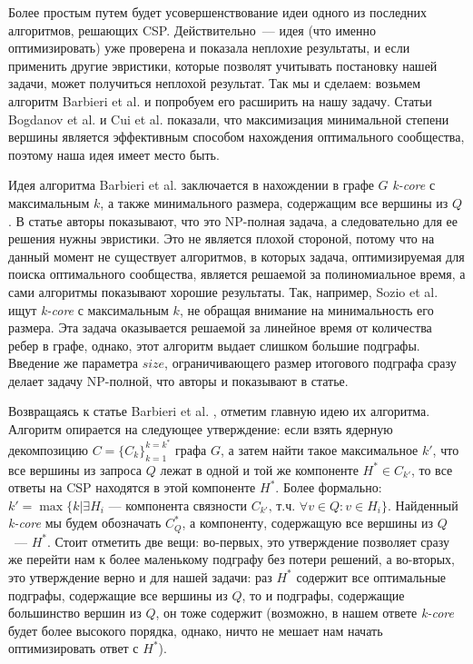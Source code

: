 Более простым путем будет усовершенствование идеи одного из последних алгоритмов, решающих CSP. Действительно~--- идея (что именно оптимизировать) уже проверена и показала неплохие результаты, и если применить другие эвристики, которые позволят учитывать постановку нашей задачи, может получиться неплохой результат. Так мы и сделаем: возьмем алгоритм Barbieri et al. \cite{Barbieri15} и попробуем его расширить на нашу задачу. Статьи Bogdanov et al. \cite{Bogdanov13} и Cui et al. \cite{Cui14} показали, что максимизация минимальной степени вершины является эффективным способом нахождения оптимального сообщества, поэтому наша идея имеет место быть. 

Идея алгоритма Barbieri et al. \cite{Barbieri15} заключается в нахождении в графе $G$ \textit{k-core} с максимальным $k$, а также минимального размера, содержащим все вершины из $Q$. В статье авторы показывают, что это NP-полная задача, а следовательно для ее решения нужны эвристики. Это не является плохой стороной, потому что на данный момент не существует алгоритмов, в которых задача, оптимизируемая для поиска оптимального сообщества, является решаемой за полиномиальное время, а сами алгоритмы показывают хорошие результаты. Так, например, Sozio et al. \cite{Sozio10} ищут \textit{k-core} с максимальным $k$, не обращая внимание на минимальность его размера. Эта задача оказывается решаемой за линейное время от количества ребер в графе, однако, этот алгоритм выдает слишком большие подграфы. Введение же параметра $size$, ограничивающего размер итогового подграфа сразу делает задачу NP-полной, что авторы и показывают в статье.

Возвращаясь к статье Barbieri et al. \cite{Barbieri15}, отметим главную идею их алгоритма. Алгоритм опирается на следующее утверждение: если взять ядерную декомпозицию $C = \{C_k\}_{k=1}^{k=k^*}$ графа $G$, а затем найти такое максимальное $k'$, что все вершины из запроса $Q$ лежат в одной и той же компоненте $H^* \in C_{k'}$, то все ответы на CSP находятся в этой компоненте $H^*$. Более формально: $k' = \max\{k | \exists H_i\mbox{~--- компонента связности } C_{k'}\mbox{, т.ч. } \forall v \in Q: v \in H_i\}$. Найденный \textit{k-core} мы будем обозначать $C_Q^*$, а компоненту, содержащую все вершины из $Q$~--- $H^*$. Стоит отметить две вещи: во-первых, это утверждение позволяет сразу же перейти нам к более маленькому подграфу без потери решений, а во-вторых, это утверждение верно и для нашей задачи: раз $H^*$ содержит все оптимальные подграфы, содержащие все вершины из $Q$, то и подграфы, содержащие большинство вершин из $Q$, он тоже содержит (возможно, в нашем ответе \textit{k-core} будет более высокого порядка, однако, ничто не мешает нам начать оптимизировать ответ с $H^*$).

